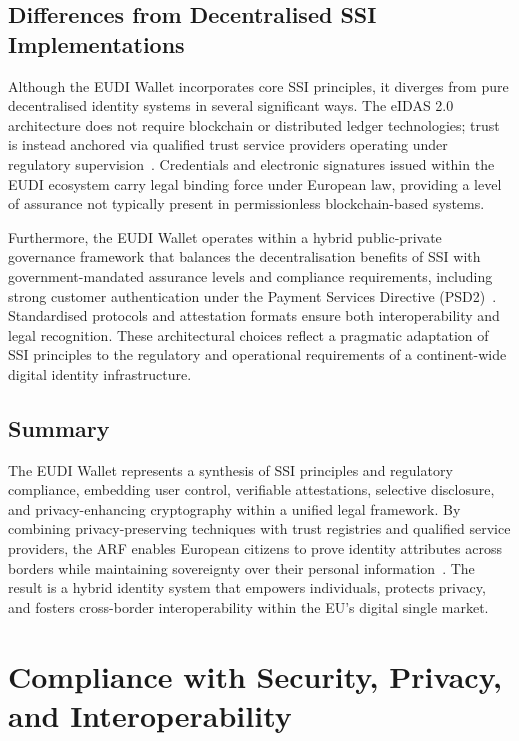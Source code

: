 \documentclass[sigconf,balance,nonacm,authordraft]{acmart}
\begin{document}
\subsection{Differences from Decentralised SSI Implementations}

Although the EUDI Wallet incorporates core SSI principles, it diverges from pure decentralised identity systems in several significant ways. The eIDAS 2.0 architecture does not require blockchain or distributed ledger technologies; trust is instead anchored via qualified trust service providers operating under regulatory supervision~\cite{Finextra_SSI_Differences}. Credentials and electronic signatures issued within the EUDI ecosystem carry legal binding force under European law, providing a level of assurance not typically present in permissionless blockchain-based systems.

Furthermore, the EUDI Wallet operates within a hybrid public-private governance framework that balances the decentralisation benefits of SSI with government-mandated assurance levels and compliance requirements, including strong customer authentication under the Payment Services Directive (PSD2)~\cite{Finextra_SSI_Differences}. Standardised protocols and attestation formats ensure both interoperability and legal recognition. These architectural choices reflect a pragmatic adaptation of SSI principles to the regulatory and operational requirements of a continent-wide digital identity infrastructure.

\subsection{Summary}

The EUDI Wallet represents a synthesis of SSI principles and regulatory compliance, embedding user control, verifiable attestations, selective disclosure, and privacy-enhancing cryptography within a unified legal framework. By combining privacy-preserving techniques with trust registries and qualified service providers, the ARF enables European citizens to prove identity attributes across borders while maintaining sovereignty over their personal information~\cite{EU_ARF2024,EU_eIDAS2024}. The result is a hybrid identity system that empowers individuals, protects privacy, and fosters cross-border interoperability within the EU's digital single market.

\section{Compliance with Security, Privacy, and Interoperability}
\label{sec:compliance}
\end{document}
